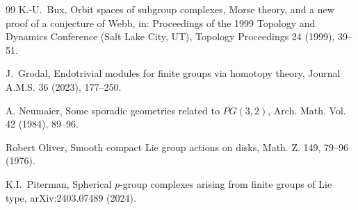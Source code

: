 \documentclass[12pt]{amsart}
\theoremstyle{plain}
\theoremstyle{definition}
\theoremstyle{remark}
\numberwithin{equation}{section}
\begin{document}
\begin{thebibliography}{99}
K.-U.~Bux, Orbit spaces of subgroup complexes, Morse theory, and a new proof of a conjecture of Webb, in: Proceedings of the 1999 Topology and Dynamics Conference (Salt Lake City, UT), Topology Proceedings 24 (1999), 39--51.



J.~Grodal, Endotrivial modules for finite groups via homotopy theory, Journal A.M.S. 36 (2023), 177--250.





A. Neumaier, Some sporadic geometries related to $PG(3,2)$, Arch. Math. Vol. 42 (1984), 89--96.

Robert Oliver,
Smooth compact Lie group actions on disks, Math. Z. 149, 79--96 (1976).



K.I.~Piterman, Spherical $p$-group complexes arising from finite groups of Lie type, arXiv:2403.07489 (2024).



\end{thebibliography}
\end{document}
